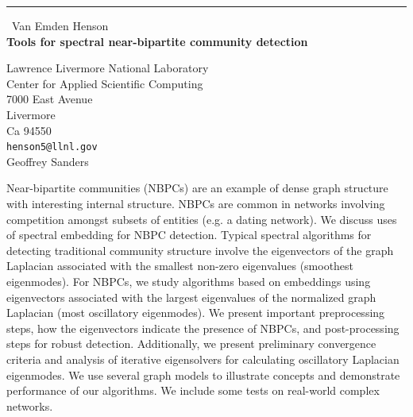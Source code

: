 \documentclass{report}
\begin{document}
\begin{center}
\rule{6in}{1pt} \
{\large Van Emden Henson \\
{\bf Tools for spectral near-bipartite community detection}}

Lawrence Livermore National Laboratory \\ Center for Applied Scientific Computing \\ 7000 East Avenue \\ Livermore \\ Ca 94550
\\
{\tt henson5@llnl.gov}\\
Geoffrey Sanders\end{center}

Near-bipartite communities (NBPCs) are an example of dense graph
structure with interesting internal structure. NBPCs are common in
networks involving competition amongst subsets of entities (e.g. a dating
network). We discuss uses of spectral embedding for NBPC detection.
Typical spectral algorithms for detecting traditional community structure
involve the eigenvectors of the graph Laplacian associated with the
smallest non-zero eigenvalues (smoothest eigenmodes). For NBPCs, we study
algorithms based on embeddings using eigenvectors associated with the
largest eigenvalues of the normalized graph Laplacian (most oscillatory
eigenmodes). We present important preprocessing steps, how the
eigenvectors indicate the presence of NBPCs, and post-processing steps
for robust detection. Additionally, we present preliminary convergence
criteria and analysis of iterative eigensolvers for calculating
oscillatory Laplacian eigenmodes. We use several graph models to
illustrate concepts and demonstrate performance of our algorithms. We
include some tests on real-world complex networks.
\end{document}
